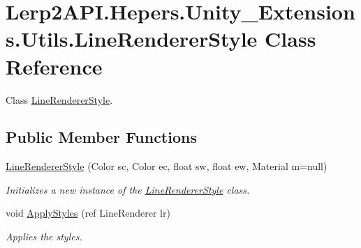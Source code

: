 \hypertarget{class_lerp2_a_p_i_1_1_hepers_1_1_unity___extensions_1_1_utils_1_1_line_renderer_style}{}\section{Lerp2\+A\+P\+I.\+Hepers.\+Unity\+\_\+\+Extensions.\+Utils.\+Line\+Renderer\+Style Class Reference}
\label{class_lerp2_a_p_i_1_1_hepers_1_1_unity___extensions_1_1_utils_1_1_line_renderer_style}


Class \hyperlink{class_lerp2_a_p_i_1_1_hepers_1_1_unity___extensions_1_1_utils_1_1_line_renderer_style}{Line\+Renderer\+Style}.  


\subsection*{Public Member Functions}
\begin{DoxyCompactItemize}
\item 
\hyperlink{class_lerp2_a_p_i_1_1_hepers_1_1_unity___extensions_1_1_utils_1_1_line_renderer_style_adce8021204d1344bbc4f4a01c9f0b70b}{Line\+Renderer\+Style} (Color sc, Color ec, float sw, float ew, Material m=null)
\begin{DoxyCompactList}\small\item\em Initializes a new instance of the \hyperlink{class_lerp2_a_p_i_1_1_hepers_1_1_unity___extensions_1_1_utils_1_1_line_renderer_style}{Line\+Renderer\+Style} class. \end{DoxyCompactList}\item 
void \hyperlink{class_lerp2_a_p_i_1_1_hepers_1_1_unity___extensions_1_1_utils_1_1_line_renderer_style_a7e15f6284a7d3abda15abf7c3913c7e8}{Apply\+Styles} (ref Line\+Renderer lr)
\begin{DoxyCompactList}\small\item\em Applies the styles. \end{DoxyCompactList}\end{DoxyCompactItemize}
